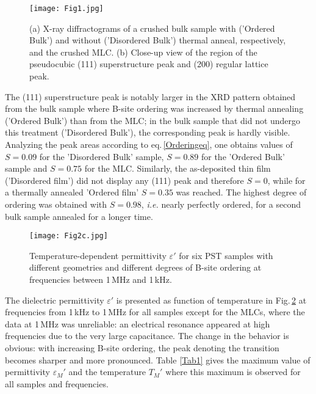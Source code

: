 \documentclass[%
 preprint, %
 amsmath,amssymb,
 aps, physrev,
]{revtex4-2}
\begin{document}
\begin{figure}[htbp]
\texttt{[image: Fig1.jpg]}
\caption{\label{f1} (a) X-ray diffractograms of a crushed bulk sample with ('Ordered Bulk') and without ('Disordered Bulk') thermal anneal, respectively, and  the crushed MLC. (b) Close-up view of the region of the pseudocubic (111) superstructure peak and (200) regular lattice peak.}
\end{figure}

The (111) superstructure peak is notably larger in the XRD pattern obtained from the bulk sample where B-site ordering was increased by thermal annealing ('Ordered Bulk') than from the MLC; in the bulk sample that did not undergo this treatment ('Disordered Bulk'), the corresponding peak is hardly visible. Analyzing the peak areas according to eq.\,\ref{Orderingeq}, one obtains values of $S=0.09$ for the 'Disordered Bulk' sample, $S=0.89$ for the 'Ordered Bulk' sample and $S=0.75$ for the MLC. Similarly, the as-deposited thin film ('Disordered film') did not display any (111) peak and therefore $S=0$, while for a thermally annealed 'Ordered film' $S=0.35$ was reached. The highest degree of ordering was obtained with $S=0.98$, {\it i.e.} nearly perfectly ordered, for a second bulk sample annealed for a longer time.

\begin{figure}[htbp]
\texttt{[image: Fig2c.jpg]}
\caption{\label{f2} Temperature-dependent permittivity $\varepsilon'$ for six PST samples with different geometries and different degrees of B-site ordering at frequencies between 1\,MHz and 1\,kHz.}
\end{figure}

The dielectric permittivity $\varepsilon'$ is presented as function of temperature in Fig.\,\ref{f2} at frequencies from 1\,kHz to 1\,MHz for all samples except for the MLCs, where the data at 1\,MHz was unreliable: an electrical resonance appeared at high frequencies due to the very large capacitance. The change in the behavior is obvious: with increasing B-site ordering, the peak denoting the transition becomes sharper and more pronounced. Table \ref{Tab1} gives the maximum value of permittivity $\varepsilon_M'$ and the temperature $T_M'$ where this maximum is observed for all samples and frequencies.
\end{document}
